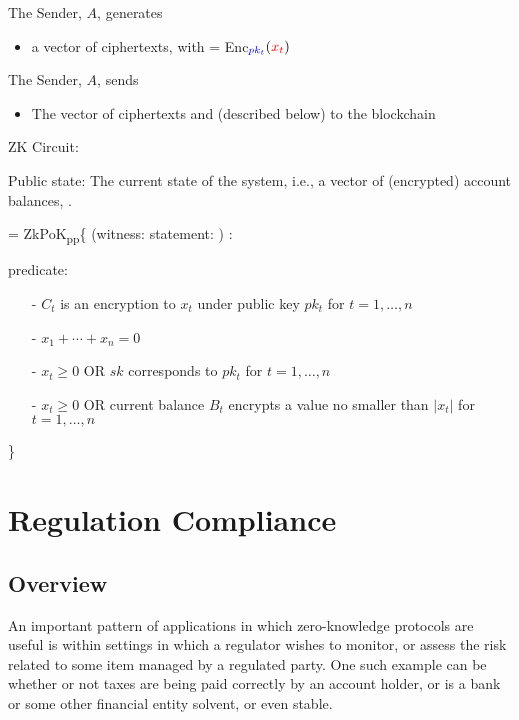 The Sender, $A$, generates
	\begin{itemize}
    \item a vector of ciphertexts,  with  = Enc$_{\blue{pk_t}}(\red{x_t})$
	\end{itemize}

The Sender, $A$, sends
	\begin{itemize}
    \item The vector of ciphertexts  and  (described below) to the blockchain
	\end{itemize}

ZK Circuit: 

Public state: The current state of the system, i.e., a vector of (encrypted) account balances, .

   = ZkPoK\textsubscript{pp}\{  (witness:  statement:  ) :

\hspace{1em}predicate: 
\begin{itemize}
\item[-] $C_t$ is an encryption to $x_t$ under public key $pk_t$ for $t=1,\ldots,n$
\item[-] $x_1 + \cdots + x_n = 0$
\item[-] $x_t \geq 0$ OR $sk$ corresponds to $pk_t$ for $t = 1,\ldots,n$
\item[-] $x_t \geq 0$ OR current balance $B_t$ encrypts a value no smaller than $|x_t|$ for $t = 1,\ldots,n$
\end{itemize}
\}




\section{Regulation Compliance}

\subsection{Overview}
An important pattern of applications in which zero-knowledge protocols are useful is within settings in which a regulator wishes to monitor, or assess the risk related to some item managed by a regulated party. One such example can be whether or not taxes are being paid correctly by an account holder, or is a bank or some other financial entity solvent, or even stable. 

